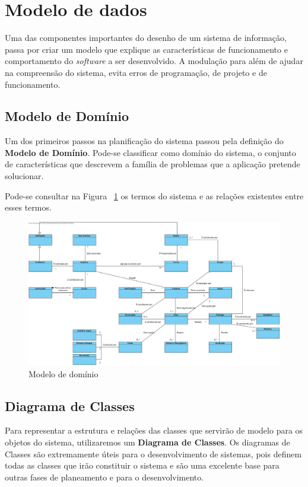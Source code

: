 \section{Modelo de dados}

Uma das componentes importantes do desenho de um sistema de informação, passa por criar um modelo que explique as características de funcionamento e comportamento do \textit{software} a ser desenvolvido. A modulação para além de ajudar na compreensão do sistema, evita erros de programação, de projeto e de funcionamento.

\subsection{Modelo de Domínio}

Um dos primeiros passos na planificação do sistema passou pela definição do \textbf{Modelo de Domínio}.
Pode-se classificar como domínio do sistema, o conjunto de características que descrevem a família de problemas que a aplicação pretende solucionar.

Pode-se consultar na Figura ~\ref{fig:modelo-dominio} os termos do sistema e as relações existentes entre esses termos.

\begin{figure}[H] 
  \centering
  \includegraphics[width=1\textwidth,center]{images/modelo_dados/modelo-dominio}
  \caption{Modelo de domínio}
  \label{fig:modelo-dominio}
\end{figure}

\subsection{Diagrama de Classes}

Para representar a estrutura e relações das classes que servirão de modelo para os objetos do sistema, utilizaremos um \textbf{Diagrama de Classes}. Os diagramas de Classes são extremamente úteis para o desenvolvimento de sistemas, pois definem todas as classes que irão constituir o sistema e são uma excelente base para outras fases de planeamento e para o desenvolvimento.


